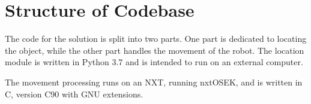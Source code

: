 \section{Structure of Codebase}
The code for the solution is split into two parts.
One part is dedicated to locating the object, while the other part handles the movement of the robot.
The location module is written in Python 3{.}7 and is intended to run on an external computer.

The movement processing runs on an NXT, running nxtOSEK, and is written in C, version C90 with GNU extensions.
